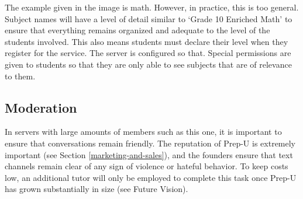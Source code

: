 \documentclass{business}
\begin{document}
    The example given in the image is math. However, in practice, this is too general. Subject names will have a level of detail similar to `Grade 10 Enriched Math' to ensure that everything remains organized and adequate to the level of the students involved. This also means students must declare their level when they register for the service. The server is configured so that. Special permissions are given to students so that they are only able to see subjects that are of relevance to them. 
    \subsection{Moderation}\label{moderation}
    In servers with large amounts of members such as this one, it is important to ensure that conversations remain friendly. The reputation of Prep-U is extremely important (see Section \ref{marketing-and-sales}), and the founders ensure that text channels remain clear of any sign of violence or hateful behavior. To keep costs low, an additional tutor will only be employed to complete this task once Prep-U has grown substantially in size (see Future Vision).
\end{document}
